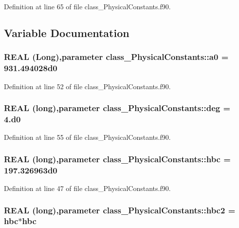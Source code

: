 Definition at line 65 of file class\_\-PhysicalConstants.f90.



\subsection{Variable Documentation}
\hypertarget{namespaceclass__PhysicalConstants_a1e0e8fd471248a1082bc06f8ff7ecd65}{
\subsubsection[{a0}]{\setlength{\rightskip}{0pt plus 5cm}REAL (Long),parameter {\bf class\_\-PhysicalConstants::a0} = 931.494028d0}}
\label{namespaceclass__PhysicalConstants_a1e0e8fd471248a1082bc06f8ff7ecd65}


Definition at line 52 of file class\_\-PhysicalConstants.f90.

\hypertarget{namespaceclass__PhysicalConstants_ace0fddb4ccc5b1acf56249fc4ab56379}{
\subsubsection[{deg}]{\setlength{\rightskip}{0pt plus 5cm}REAL (long),parameter {\bf class\_\-PhysicalConstants::deg} = 4.d0}}
\label{namespaceclass__PhysicalConstants_ace0fddb4ccc5b1acf56249fc4ab56379}


Definition at line 55 of file class\_\-PhysicalConstants.f90.

\hypertarget{namespaceclass__PhysicalConstants_a7d9801ae88aee6ffd97a9c8e988c66ec}{
\subsubsection[{hbc}]{\setlength{\rightskip}{0pt plus 5cm}REAL (long),parameter {\bf class\_\-PhysicalConstants::hbc} = 197.326963d0}}
\label{namespaceclass__PhysicalConstants_a7d9801ae88aee6ffd97a9c8e988c66ec}


Definition at line 47 of file class\_\-PhysicalConstants.f90.

\hypertarget{namespaceclass__PhysicalConstants_a122a8419f83dc397e3a760e7b07d672f}{
\subsubsection[{hbc2}]{\setlength{\rightskip}{0pt plus 5cm}REAL (long),parameter {\bf class\_\-PhysicalConstants::hbc2} = {\bf hbc}$\ast${\bf hbc}}}
\label{namespaceclass__PhysicalConstants_a122a8419f83dc397e3a760e7b07d672f}


